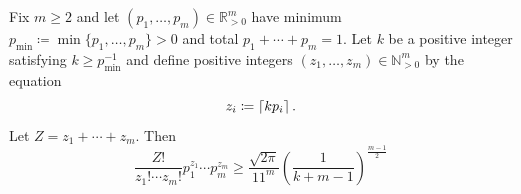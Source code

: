 \documentclass[notitlepage, 10pt]{article}
\begin{document}
\begin{lem}
    \label{lem:multinomial_dist_lower_bound}
    Fix $m\geq 2$ and let $(p_1, \ldots, p_m) \in \mathbb R_{> 0}^{m}$ have minimum $p_{\min} \coloneqq \min\{ p_1, \ldots, p_m\} > 0$ and total $p_1 + \cdots + p_m = 1$.
    Let $k$ be a positive integer satisfying $k \geq p_{\min}^{-1}$ and define positive integers $(z_1, \ldots, z_m) \in \mathbb N_{>0}^{m}$ by the equation
    \begin{equation}
        z_{i} \coloneqq \left\lceil kp_{i}\right\rceil.
    \end{equation}
    Let $Z = z_1+\cdots+z_m$.
    Then
    \begin{equation}
        \label{eq:multinomial_dist_lower_bound}
        \frac{Z!}{z_1! \cdots z_m!}p_1^{z_{1}}\cdots p_{m}^{z_{m}} \geq \frac{\sqrt{2\pi}}{11^m}\left(\frac{1}{k+m-1}\right)^{\frac{m-1}{2}}
    \end{equation}
\end{lem}
\end{document}

